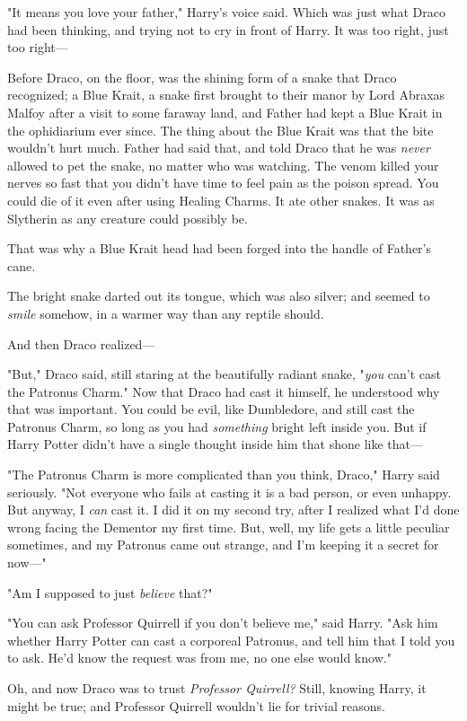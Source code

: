 "It means you love your father," Harry’s voice said. Which was just what Draco
had been thinking, and trying not to cry in front of Harry. It was too right,
just too right—

Before Draco, on the floor, was the shining form of a snake that Draco
recognized; a Blue Krait, a snake first brought to their manor by Lord Abraxas
Malfoy after a visit to some faraway land, and Father had kept a Blue Krait in
the ophidiarium ever since. The thing about the Blue Krait was that the bite
wouldn’t hurt much. Father had said that, and told Draco that he was
\emph{never} allowed to pet the snake, no matter who was watching. The venom
killed your nerves so fast that you didn’t have time to feel pain as the poison
spread. You could die of it even after using Healing Charms. It ate other
snakes. It was as Slytherin as any creature could possibly be.

That was why a Blue Krait head had been forged into the handle of Father’s cane.

The bright snake darted out its tongue, which was also silver; and seemed to
\emph{smile} somehow, in a warmer way than any reptile should.

And then Draco realized—

"But," Draco said, still staring at the beautifully radiant snake, "\emph{you}
can’t cast the Patronus Charm." Now that Draco had cast it himself, he
understood why that was important. You could be evil, like Dumbledore, and
still cast the Patronus Charm, so long as you had \emph{something} bright left
inside you. But if Harry Potter didn’t have a single thought inside him that
shone like that—

"The Patronus Charm is more complicated than you think, Draco," Harry said
seriously. "Not everyone who fails at casting it is a bad person, or even
unhappy. But anyway, I \emph{can} cast it. I did it on my second try, after I
realized what I’d done wrong facing the Dementor my first time. But, well, my
life gets a little peculiar sometimes, and my Patronus came out strange, and
I’m keeping it a secret for now—"

"Am I supposed to just \emph{believe} that?"

"You can ask Professor Quirrell if you don’t believe me," said Harry. "Ask him
whether Harry Potter can cast a corporeal Patronus, and tell him that I told
you to ask. He’d know the request was from me, no one else would know."

Oh, and now Draco was to trust \emph{Professor Quirrell?} Still, knowing Harry,
it might be true; and Professor Quirrell wouldn’t lie for trivial reasons.


